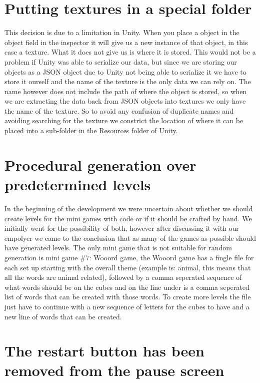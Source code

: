\section{Putting textures in a special folder}
This decision is due to a limitation in Unity. When you place a object in the object field in the inspector it will give us a new instance of that object, in this case a texture. What it does not give us is where it is stored. This would not be a problem if Unity was able to serialize our data, but since we are storing our objects as a JSON object due to Unity not being able to serialize it we have to store it ourself and the name of the texture is the only data we can rely on. The name however does not include the path of where the object is stored, so when we are extracting the data back from JSON objects into textures we only have the name of the texture. So to avoid any confusion of duplicate names and avoiding searching for the texture we constrict the location of where it can be placed into a sub-folder in the Resources folder of Unity.

\section{Procedural generation over predetermined levels}
In the beginning of the development we were uncertain about whether we should create levels for the mini games with code or if it should be crafted by hand. We initially went for the possibility of both, however after discussing it with our empolyer we came to the conclusion that as many of the games as possible should have generated levels. The only mini game that is not suitable for random generation is mini game \#7: Wooord game, the Wooord game has a fingle file for each set up starting with the overall theme (example is: animal, this means that all the words are animal related), followed by a comma seperated sequence of what words should be on the cubes and on the line under is a comma seperated list of words that can be created with those words. To create more levels the file just have to continue with a new sequence of letters for the cubes to have and a new line of words that can be created.

\section{The restart button has been removed from the pause screen}

